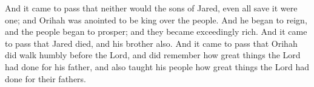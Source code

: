 And it came to pass that neither would the sons of Jared, even all save it were one; and Orihah was anointed to be king over the people.
\bverse \iffalse And he began to reign, and the people began to prosper; and they became exceedingly rich. \fi
And he began to reign, and the people began to prosper; and they became exceedingly rich.
\bverse \iffalse And it came to pass that Jared died, and his brother also. \fi
And it came to pass that Jared died, and his brother also.
\bverse \iffalse And it came to pass that Orihah did walk humbly before the Lord, and did remember how great things the Lord had done for his father, and also taught his people how great things the Lord had done for their fathers. \fi
And it came to pass that Orihah did walk humbly before the Lord, and did remember how great things the Lord had done for his father, and also taught his people how great things the Lord had done for their fathers.

